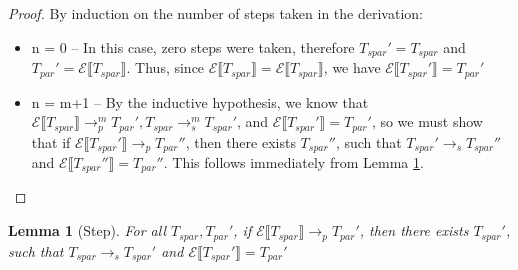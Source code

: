\documentclass[9pt]{article}
\newtheorem{lemma}{Lemma}
\newcommand\specStep{\rightarrow_{s}}
\newcommand\parStep{\rightarrow_{p}}
\newcommand{\erase}[1]{\mathcal{E}\llbracket #1 \rrbracket}
\begin{document}
\begin{proof}
By induction on the number of steps taken in the derivation: 

\begin{itemize}
\item n = 0 -- In this case, zero steps were taken, therefore $T_{spar}' = T_{spar}$ and $T_{par}' = \erase{T_{spar}}$.  Thus, since $\erase{T_{spar}} = \erase{T_{spar}}$, we have $\erase{T_{spar}'} = T_{par}'$

\item n = m+1 -- By the inductive hypothesis, we know that $\erase{T_{spar}} \parStep^m T_{par}', T_{spar} \specStep^m T_{spar}'$, and $\erase{T_{spar}'} = T_{par}'$, so we must show that if $\erase{T_{spar}'} \parStep T_{par}''$, then there exists $T_{spar}''$, such that $T_{spar}' \specStep T_{spar}''$ and $\erase{T_{spar}''} = T_{par}''$.  This follows immediately from Lemma \ref{StructuralStep}.
\end{itemize}

\end{proof}

\begin{lemma}[Step]
\label{StructuralStep}
For all $T_{spar}, T_{par}'$, if $\mathcal{E} \llbracket T_{spar}\rrbracket \parStep T_{par}'$, then there exists $T_{spar}'$, such that $T_{spar} \specStep T_{spar}'$ and $\mathcal{E}\llbracket T_{spar}'\rrbracket = T_{par}'$
\end{lemma}
\end{document}
